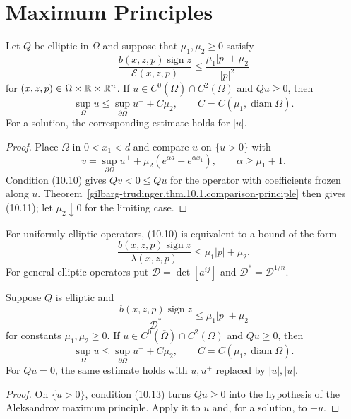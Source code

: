 \section{Maximum Principles}

\begin{theorem}
\label{gilbarg-trudinger.thm.10.3.apriori-bound}
Let $Q$ be elliptic in $\Omega$ and suppose that $\mu_1,\mu_2\ge0$ satisfy
\begin{equation}
\frac{b(x,z,p)\operatorname{sign}z}{\mathcal E(x,z,p)}
\le\frac{\mu_1|p|+\mu_2}{|p|^2}
\tag{10.10}
\end{equation}
for $(x,z,p)\in\Omega\times\mathbb{R}\times\mathbb{R}^n$.  If
$u\in C^0(\overline\Omega)\cap C^2(\Omega)$ and $Qu\ge0$, then
\begin{equation}
\sup_\Omega u\le\sup_{\partial\Omega}u^++C\mu_2,
\qquad C=C(\mu_1,\operatorname{diam}\Omega).
\tag{10.11}
\end{equation}
For a solution, the corresponding estimate holds for $|u|$.
\end{theorem}
\begin{proof}
\sketch Place $\Omega$ in $0<x_1<d$ and compare $u$ on $\{u>0\}$ with
\[
v=\sup_{\partial\Omega}u^+
+\mu_2(e^{\alpha d}-e^{\alpha x_1}),\qquad \alpha\ge\mu_1+1.
\]
Condition \textup{(10.10)} gives $\bar Qv<0\le\bar Qu$ for the operator
with coefficients frozen along $u$.  Theorem~\ref{gilbarg-trudinger.thm.10.1.comparison-principle}
then gives \textup{(10.11)}; let $\mu_2\downarrow0$ for the limiting case.
\end{proof}

For uniformly elliptic operators, \textup{(10.10)} is equivalent to a bound
of the form
\begin{equation}
\frac{b(x,z,p)\operatorname{sign}z}{\lambda(x,z,p)}
\le\mu_1|p|+\mu_2.
\tag{10.12}
\end{equation}
For general elliptic operators put
$\mathscr D=\det[a^{ij}]$ and $\mathscr D^*=\mathscr D^{1/n}$.

\begin{theorem}
\label{gilbarg-trudinger.thm.10.4.aleksandrov-type-bound}
Suppose $Q$ is elliptic and
\begin{equation}
\frac{b(x,z,p)\operatorname{sign}z}{\mathscr D^*}
\le\mu_1|p|+\mu_2
\tag{10.13}
\end{equation}
for constants $\mu_1,\mu_2\ge0$.  If
$u\in C^0(\overline\Omega)\cap C^2(\Omega)$ and $Qu\ge0$, then
\begin{equation}
\sup_\Omega u\le\sup_{\partial\Omega}u^++C\mu_2,
\qquad C=C(\mu_1,\operatorname{diam}\Omega).
\tag{10.14}
\end{equation}
For $Qu=0$, the same estimate holds with $u,u^+$ replaced by
$|u|,|u|$.
\end{theorem}
\begin{proof}
\sketch On $\{u>0\}$, condition \textup{(10.13)} turns $Qu\ge0$ into
the hypothesis of the Aleksandrov maximum principle.  Apply it to $u$ and,
for a solution, to $-u$.
\end{proof}

